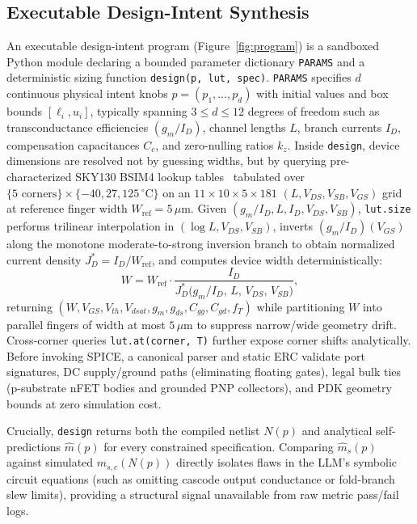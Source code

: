 \subsection{Executable Design-Intent Synthesis}
\label{sec:intent}


An executable design-intent program (Figure~\ref{fig:program}) is a sandboxed Python module declaring a bounded parameter dictionary \texttt{PARAMS} and a deterministic sizing function \texttt{design(p, lut, spec)}. \texttt{PARAMS} specifies $d$ continuous physical intent knobs $p = (p_1, \dots, p_d)$ with initial values and box bounds $[\ell_i, u_i]$, typically spanning $3 \le d \le 12$ degrees of freedom such as transconductance efficiencies $(g_m/I_D)$, channel lengths $L$, branch currents $I_D$, compensation capacitances $C_c$, and zero-nulling ratios $k_z$. Inside \texttt{design}, device dimensions are resolved not by guessing widths, but by querying pre-characterized SKY130 BSIM4 lookup tables~\cite{jespers2017gmid} tabulated over $\{5\text{ corners}\} \times \{-40, 27, 125\,^\circ\mathrm{C}\}$ on an $11 \times 10 \times 5 \times 181$ $(L, V_{DS}, V_{SB}, V_{GS})$ grid at reference finger width $W_{\text{ref}} = 5\,\mu\mathrm{m}$. Given $(g_m/I_D, L, I_D, V_{DS}, V_{SB})$, \texttt{lut.size} performs trilinear interpolation in $(\log L, V_{DS}, V_{SB})$, inverts $(g_m/I_D)(V_{GS})$ along the monotone moderate-to-strong inversion branch to obtain normalized current density $J_D^* = I_D / W_{\text{ref}}$, and computes device width deterministically:
\begin{equation}
  W = W_{\text{ref}} \cdot \frac{I_D}{J_D^*\!\big(g_m/I_D,\, L,\, V_{DS},\, V_{SB}\big)},
  \label{eq:lut_size}
\end{equation}
returning $(W, V_{GS}, V_{th}, V_{dsat}, g_m, g_{ds}, C_{gg}, C_{gd}, f_T)$ while partitioning $W$ into parallel fingers of width at most $5\,\mu\mathrm{m}$ to suppress narrow/wide geometry drift. Cross-corner queries \texttt{lut.at(corner, T)} further expose corner shifts analytically. Before invoking SPICE, a canonical parser and static ERC validate port signatures, DC supply/ground paths (eliminating floating gates), legal bulk ties (p-substrate nFET bodies and grounded PNP collectors), and PDK geometry bounds at zero simulation cost.

Crucially, \texttt{design} returns both the compiled netlist $N(p)$ and analytical self-predictions $\hat{m}(p)$ for every constrained specification. Comparing $\hat{m}_s(p)$ against simulated $m_{s,c}(N(p))$ directly isolates flaws in the LLM's symbolic circuit equations (such as omitting cascode output conductance or fold-branch slew limits), providing a structural signal unavailable from raw metric pass/fail logs.

